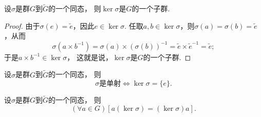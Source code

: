 \begin{theorem}
设\(\sigma\)是群\(G\)到\(\tilde{G}\)的一个同态，
则\(\ker\sigma\)是\(G\)的一个子群.
\begin{proof}
由于\(\sigma(e)=\tilde{e}\)，因此\(e\in\ker\sigma\).
任取\(a,b\in\ker\sigma\)，则\(\sigma(a)=\sigma(b)=\tilde{e}\)，从而\[
	\sigma(a \times b^{-1}) = \sigma(a) \times (\sigma(b))^{-1}
	= \tilde{e} \times \tilde{e}^{-1}
	= \tilde{e};
\]
于是\(a \times b^{-1} \in \ker\sigma\)，
这就是说，\(\ker\sigma\)是\(G\)的一个子群.
\end{proof}
\end{theorem}

\begin{theorem}
设\(\sigma\)是群\(G\)到\(\tilde{G}\)的一个同态，
则\[
	\text{\(\sigma\)是单射}
	\iff
	\ker\sigma=\{e\}.
\]
\end{theorem}

\begin{theorem}
设\(\sigma\)是群\(G\)到\(\tilde{G}\)的一个同态，
则\[
	(\forall a \in G)[a(\ker\sigma)=(\ker\sigma)a].
\]
\end{theorem}
